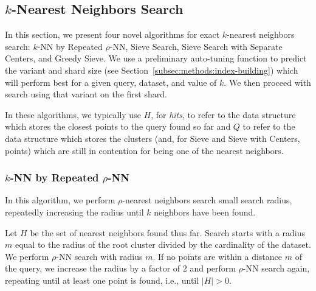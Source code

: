 \subsection{\texorpdfstring{$k$}{k}-Nearest Neighbors Search}
\label{subsec:methods:knn-search}

In this section, we present four novel algorithms for exact $k$-nearest neighbors search: $k$-NN by Repeated $\rho$-NN, Sieve Search, Sieve Search with Separate Centers, 
and Greedy Sieve. 
We use a preliminary auto-tuning function to predict the variant and shard size (see Section~\ref{subsec:methods:index-building}) which will perform 
best for a given query, dataset, and value of $k$. We then proceed with search using that variant on the first shard. 

In these algorithms, we typically use $H$, for \emph{hits}, to refer to the data structure which stores the closest points to the query found so far and
$Q$ to refer to the data structure which stores the clusters (and, for Sieve and Sieve with Centers, points) which are still in contention for being one of the nearest neighbors.


\subsubsection{$k$-NN by Repeated $\rho$-NN}
\label{subsubsec:methods:knn-search:repeated-rnn}


In this algorithm, we perform $\rho$-nearest neighbors search small search radius, repeatedly increasing the radius until $k$ neighbors
have been found.

Let $H$ be the set of nearest neighbors found thus far.
Search starts with a radius $m$ equal to the radius of the root cluster divided by
the cardinality of the dataset. We perform $\rho$-NN search with radius $m$. 
If no points are within a distance $m$ of the query, we increase the radius by a factor of
2 and perform $\rho$-NN search again, repeating until at least one point is found, i.e., 
until $|H| > 0$.



